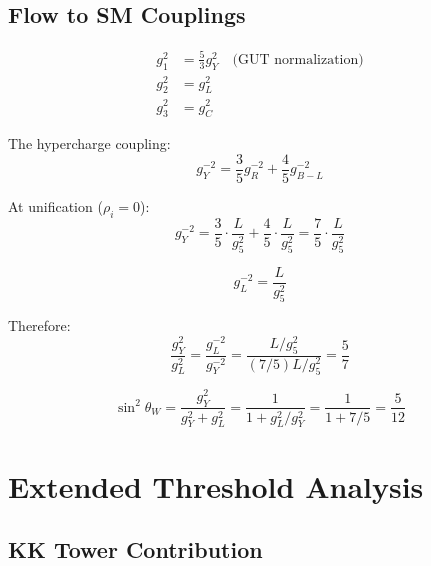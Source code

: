 \documentclass[11pt,a4paper]{article}
\theoremstyle{definition}
\begin{document}
\subsection{Flow to SM Couplings}
\label{subsec:sm_flow}

\begin{align}
\label{eq:flow_g1}
g_1^2 &= \frac{5}{3} g_Y^2 \quad \text{(GUT normalization)} \\
\label{eq:flow_g2}
g_2^2 &= g_L^2 \\
\label{eq:flow_g3}
g_3^2 &= g_C^2
\end{align}

The hypercharge coupling:
\begin{equation}
\label{eq:gY_from_PS}
g_Y^{-2} = \frac{3}{5} g_R^{-2} + \frac{4}{5} g_{B-L}^{-2}
\end{equation}

At unification ($\rho_i = 0$):
\begin{equation}
\label{eq:gY_unified}
g_Y^{-2} = \frac{3}{5} \cdot \frac{L}{g_5^2} + \frac{4}{5} \cdot \frac{L}{g_5^2} = \frac{7}{5} \cdot \frac{L}{g_5^2}
\end{equation}

\begin{equation}
\label{eq:gL_unified}
g_L^{-2} = \frac{L}{g_5^2}
\end{equation}

Therefore:
\begin{equation}
\label{eq:ratio_gY_gL}
\frac{g_Y^2}{g_L^2} = \frac{g_L^{-2}}{g_Y^{-2}} = \frac{L/g_5^2}{(7/5) L/g_5^2} = \frac{5}{7}
\end{equation}

\begin{equation}
\label{eq:sw2_final}
\sin^2\theta_W = \frac{g_Y^2}{g_Y^2 + g_L^2} = \frac{1}{1 + g_L^2/g_Y^2} = \frac{1}{1 + 7/5} = \frac{5}{12}
\end{equation}

\section{Extended Threshold Analysis}
\label{app:thresholds}

\subsection{KK Tower Contribution}
\label{subsec:kk_tower}
\end{document}
